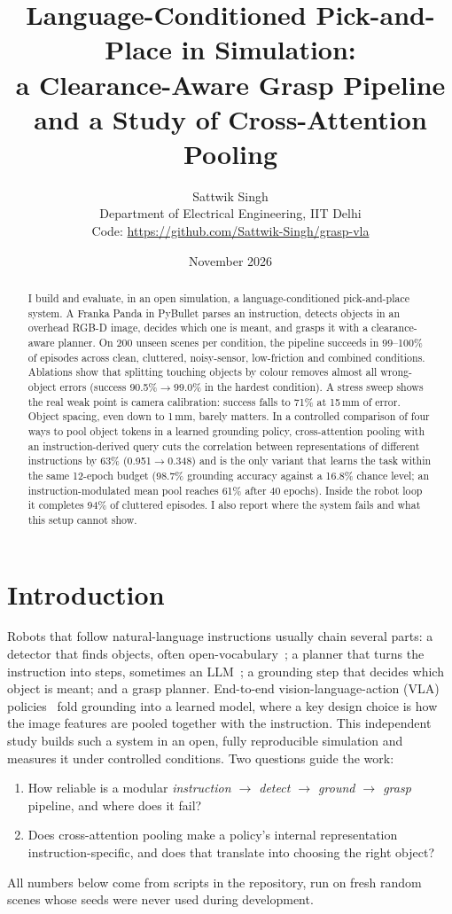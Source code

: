 \documentclass[10pt,a4paper]{article}
\title{\vspace{-1.2cm}\textbf{Language-Conditioned Pick-and-Place in Simulation:\\
a Clearance-Aware Grasp Pipeline and a Study of Cross-Attention Pooling}}
\author{Sattwik Singh\\ \small Department of Electrical Engineering, IIT Delhi\\
\small Code: \url{https://github.com/Sattwik-Singh/grasp-vla}}
\date{\small November 2026}
\begin{document}
\maketitle
\vspace{-0.6cm}

\begin{abstract}
\noindent I build and evaluate, in an open simulation, a
language-conditioned pick-and-place system. A Franka Panda in PyBullet
parses an instruction, detects objects in an overhead RGB-D image, decides which
one is meant, and grasps it with a clearance-aware planner. On 200 unseen scenes
per condition, the pipeline succeeds in 99--100\% of episodes across clean,
cluttered, noisy-sensor, low-friction and combined conditions. Ablations show
that splitting touching objects by colour removes almost all wrong-object
errors (success 90.5\%$\rightarrow$99.0\% in the hardest condition).
A stress sweep shows the real weak point is camera calibration: success falls
to 71\% at 15\,mm of error. Object spacing, even down to 1\,mm, barely matters.
In a controlled comparison of four ways to pool object tokens in a learned
grounding policy, cross-attention pooling with an instruction-derived query
cuts the correlation between representations of different instructions by 63\%
(0.951$\rightarrow$0.348) and is the only variant that learns the task within the same 12-epoch budget
(98.7\% grounding accuracy against a 16.8\% chance level; an instruction-modulated
mean pool reaches 61\% after 40 epochs). Inside the robot loop it
completes 94\% of cluttered episodes. I also report where the system fails
and what this setup cannot show.
\end{abstract}

\section{Introduction}
Robots that follow natural-language instructions usually chain several parts:
a detector that finds objects, often open-vocabulary~\cite{owlvit,clip}; a
planner that turns the instruction into steps, sometimes an LLM~\cite{saycan};
a grounding step that decides which object is meant; and a grasp planner.
End-to-end vision-language-action (VLA) policies~\cite{cliport,rt2} fold
grounding into a learned model, where a key design choice is how the image
features are pooled together with the instruction. This independent study builds such a
system in an open, fully reproducible simulation and measures it under
controlled conditions. Two questions guide the work:
\begin{enumerate}\itemsep0pt
\item[\textbf{Q1}] How reliable is a modular \emph{instruction $\rightarrow$
detect $\rightarrow$ ground $\rightarrow$ grasp} pipeline, and where does it fail?
\item[\textbf{Q2}] Does cross-attention pooling make a policy's internal
representation instruction-specific, and does that translate into choosing
the right object?
\end{enumerate}
All numbers below come from scripts in the repository, run on fresh random
scenes whose seeds were never used during development.
\end{document}
